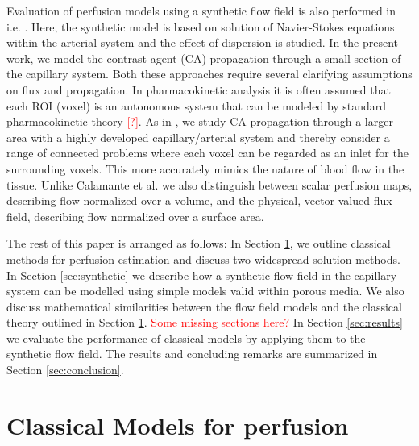 \documentclass[paper=a4, fontsize=11pt,parskip=half,headings=small]{scrartcl}
\newcommand{\missingsource}{\textcolor{red}{[?]}}
\begin{document}
	Evaluation of perfusion models using a synthetic flow field is also performed in i.e. \cite{calamante03}. 
	Here, the synthetic model is based on solution of Navier-Stokes equations within the arterial system and the effect of dispersion is studied.  
	In the present work, we model the contrast agent (CA) propagation through a small section of the capillary system. 
	Both these approaches require several clarifying assumptions on flux and propagation. 
	In pharmacokinetic analysis it is often assumed that each ROI (voxel) is an autonomous system that can be modeled by standard pharmacokinetic theory \missingsource. 
	As in \cite{calamante03}, we study CA propagation through a larger area with a highly developed capillary/arterial system and thereby consider a range of connected problems where each voxel can be regarded as an inlet for the surrounding voxels.  
This more accurately mimics the nature of blood flow in the tissue.  
	Unlike Calamante et al. \cite{calamante03} we also distinguish between scalar perfusion maps, describing flow normalized over a volume, and the physical, vector valued flux field, describing flow normalized over a surface area. 


	The rest of this paper is arranged as follows: In Section \ref{sec:classical}, we outline classical methods for perfusion estimation and discuss two widespread solution methods. 
	In Section \ref{sec:synthetic} we describe how a synthetic flow field in the capillary system can be modelled using simple models valid within porous media. 
	We also discuss mathematical similarities between the flow field models and the classical theory outlined in Section \ref{sec:classical}. 
	\textcolor{red}{Some missing sections here?}
	In Section \ref{sec:results} we evaluate the performance of classical models by applying them to the synthetic flow field. 
	The results and concluding remarks are summarized in Section \ref{sec:conclusion}.
	
	
	
	\section{Classical Models for perfusion} \label{sec:classical}
\end{document}
